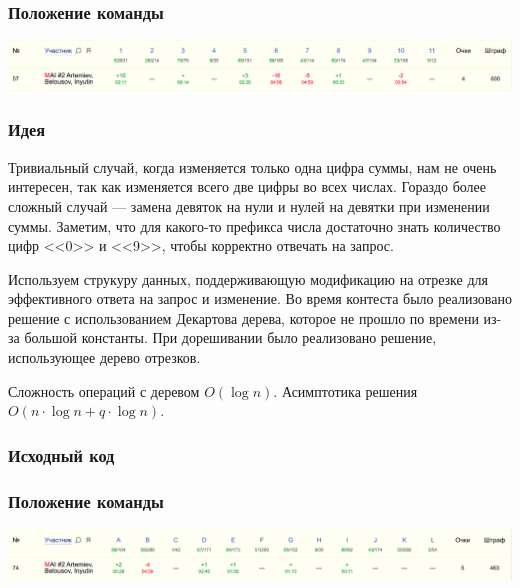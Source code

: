 \documentclass[12pt]{article}
\begin{document}
\subsubsection*{Положение команды}
\includegraphics[scale=0.25]{images/gp_siberia.png}\newline\noindent
\pagebreak


\subsubsection*{Идея}
Тривиальный случай, когда изменяется только одна цифра суммы, нам не очень интересен, так как изменяется всего две цифры во всех числах. Гораздо более сложный случай --- замена девяток на нули и нулей на девятки при изменении суммы. Заметим, что для какого-то префикса числа достаточно знать количество цифр <<0>> и <<9>>, чтобы корректно отвечать на запрос.

Используем струкуру данных, поддерживающую модификацию на отрезке для эффективного ответа на запрос и изменение. Во время контеста было реализовано решение с использованием Декартова дерева, которое не прошло по времени из-за большой константы. При дорешивании было реализовано решение, использующее дерево отрезков.

Сложность операций с деревом $O(\log{n})$. Асимптотика решения $O(n \cdot \log{n} + q \cdot \log{n})$.

\subsubsection*{Исходный код}

\subsubsection*{Положение команды}
\includegraphics[scale=0.25]{images/gp_edg.png}\newline\noindent
\pagebreak
\end{document}

